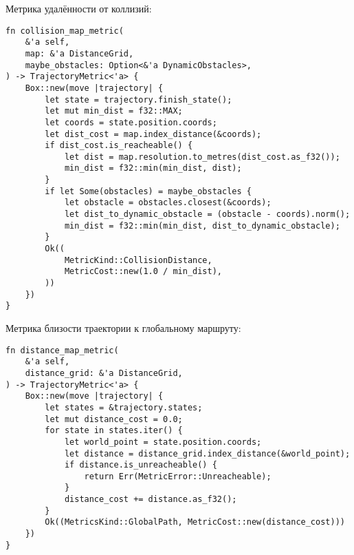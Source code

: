 Метрика удалённости от коллизий:
\begin{lstlisting}
fn collision_map_metric(
    &'a self,
    map: &'a DistanceGrid,
    maybe_obstacles: Option<&'a DynamicObstacles>,
) -> TrajectoryMetric<'a> {
    Box::new(move |trajectory| {
        let state = trajectory.finish_state();
        let mut min_dist = f32::MAX;
        let coords = state.position.coords;
        let dist_cost = map.index_distance(&coords);
        if dist_cost.is_reacheable() {
            let dist = map.resolution.to_metres(dist_cost.as_f32());
            min_dist = f32::min(min_dist, dist);
        }
        if let Some(obstacles) = maybe_obstacles {
            let obstacle = obstacles.closest(&coords);
            let dist_to_dynamic_obstacle = (obstacle - coords).norm();
            min_dist = f32::min(min_dist, dist_to_dynamic_obstacle);
        }
        Ok((
            MetricKind::CollisionDistance,
            MetricCost::new(1.0 / min_dist),
        ))
    })
}
\end{lstlisting}

Метрика близости траектории к глобальному маршруту:
\begin{lstlisting}
fn distance_map_metric(
    &'a self,
    distance_grid: &'a DistanceGrid,
) -> TrajectoryMetric<'a> {
    Box::new(move |trajectory| {
        let states = &trajectory.states;
        let mut distance_cost = 0.0;
        for state in states.iter() {
            let world_point = state.position.coords;
            let distance = distance_grid.index_distance(&world_point);
            if distance.is_unreacheable() {
                return Err(MetricError::Unreacheable);
            }
            distance_cost += distance.as_f32();
        }
        Ok((MetricsKind::GlobalPath, MetricCost::new(distance_cost)))
    })
}
\end{lstlisting}
